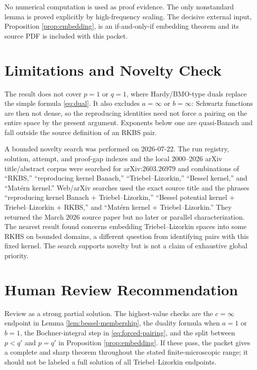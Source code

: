 \documentclass[11pt]{article}
\begin{document}
No numerical computation is used as proof evidence.  The only nonstandard
lemma is proved explicitly by high-frequency scaling.  The decisive
external input, Proposition \ref{prop:embedding}, is an if-and-only-if
embedding theorem and its source PDF is included with this packet.

\section*{Limitations and Novelty Check}

The result does not cover $p=1$ or $q=1$, where Hardy/BMO-type duals
replace the simple formula \eqref{eq:dual}.  It also excludes
$a=\infty$ or $b=\infty$: Schwartz functions are then not dense, so
the reproducing identities need not force a pairing on the entire space by
the present argument.  Exponents below one are quasi-Banach and fall outside
the source definition of an RKBS pair.

A bounded novelty search was performed on 2026-07-22.  The run registry,
solution, attempt, and proof-gap indexes and the local 2000--2026 arXiv
title/abstract corpus were searched for arXiv:2603.26979 and combinations of
``RKBS,'' ``reproducing kernel Banach,'' ``Triebel--Lizorkin,'' ``Bessel
kernel,'' and ``Mat\'ern kernel.''  Web/arXiv searches used the exact source
title and the phrases ``reproducing kernel Banach + Triebel--Lizorkin,''
``Bessel potential kernel + Triebel--Lizorkin + RKBS,'' and ``Mat\'ern
kernel + Triebel--Lizorkin.''  They returned the March 2026 source paper but
no later or parallel characterization.  The nearest result found concerns
embedding Triebel--Lizorkin spaces into some RKHS on bounded domains, a
different question from identifying pairs with this fixed kernel.  The
search supports novelty but is not a claim of exhaustive global priority.

\section*{Human Review Recommendation}

Review as a strong partial solution.  The highest-value checks are the
$c=\infty$ endpoint in Lemma \ref{lem:bessel-membership}, the duality
formula when $a=1$ or $b=1$, the Bochner-integral step in
\eqref{eq:forced-pairing}, and the split between $p<q'$ and $p=q'$ in
Proposition \ref{prop:embedding}.  If these pass, the packet gives a complete
and sharp theorem throughout the stated finite-microscopic range; it should
not be labeled a full solution of all Triebel--Lizorkin endpoints.
\end{document}

